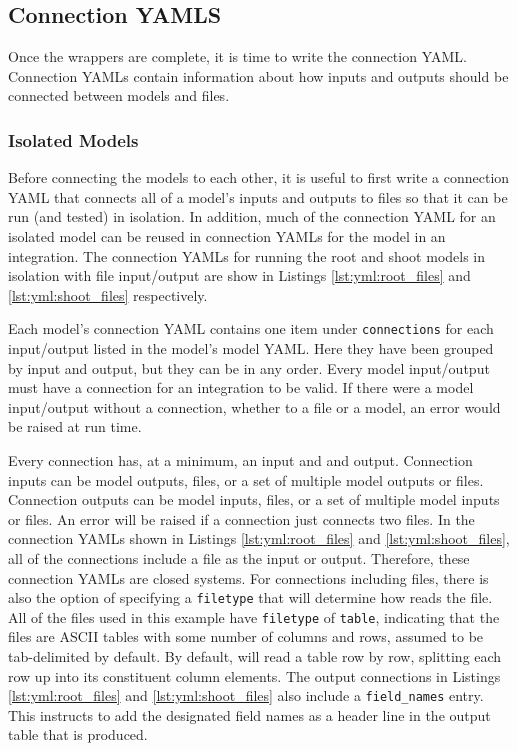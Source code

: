 \documentclass[journal]{IEEEtran}
\newcommand{\todo}[1]{{\color{red}{#1}}}
\newcommand{\pkg}{{\tt \todo{cis\_interface}}{}}
\newcommand{\rootymlfiles}{}
\newcommand{\shootymlfiles}{}
\begin{document}
\subsection{Connection YAMLS}
%
Once the wrappers are complete, it is time to write the connection YAML. Connection YAMLs contain information about how inputs and outputs should be connected between models and files. 

\subsubsection{Isolated Models}
%
Before connecting the models to each other, it is useful to first write a connection YAML that connects all of a model's inputs and outputs to files so that it can be run (and tested) in isolation. In addition, much of the connection YAML for an isolated model can be reused in connection YAMLs for the model in an integration. The connection YAMLs for running the root and shoot models in isolation with file input/output are show in Listings \ref{lst:yml:root_files} and \ref{lst:yml:shoot_files} respectively.
%
\rootymlfiles
%
\shootymlfiles
%
Each model's connection YAML contains one item under {\tt connections} for each input/output listed in the model's model YAML. Here they have been grouped by input and output, but they can be in any order. Every model input/output must have a connection for an integration to be valid. If there were a model input/output without a connection, whether to a file or a model, an error would be raised at run time. 

Every connection has, at a minimum, an input and and output. Connection inputs can be model outputs, files, or a set of multiple model outputs or files. Connection outputs can be model inputs, files, or a set of multiple model inputs or files. An error will be raised if a connection just connects two files. In the connection YAMLs shown in Listings \ref{lst:yml:root_files} and \ref{lst:yml:shoot_files}, all of the connections include a file as the input or output. Therefore, these connection YAMLs are closed systems. For connections including files, there is also the option of specifying a {\tt filetype} that will determine how {\pkg} reads the file. All of the files used in this example have {\tt filetype} of {\tt table}, indicating that the files are ASCII tables with some number of columns and rows, assumed to be tab-delimited by default. By default, {\pkg} will read a table row by row, splitting each row up into its constituent column elements. The output connections in Listings \ref{lst:yml:root_files} and \ref{lst:yml:shoot_files} also include a {\tt field\_names} entry. This instructs {\pkg} to add the designated field names as a header line in the output table that is produced.
\end{document}
